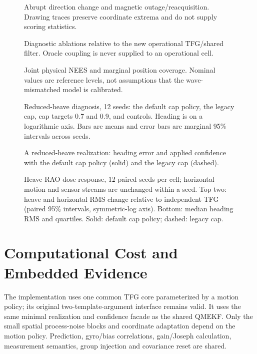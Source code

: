\documentclass[conference]{IEEEtran}
\newcommand{\fig}[1]{\resizebox{\linewidth}{!}{}}
\begin{document}
\begin{figure}[!t]\centering\fig{direction_outage}
\caption{Abrupt direction change and magnetic outage/reacquisition. Drawing
traces preserve coordinate extrema and do not supply scoring statistics.}
\end{figure}
\begin{figure}[!t]\centering\fig{ablations}
\caption{Diagnostic ablations relative to the new operational TFG/shared
filter. Oracle coupling is never supplied to an operational cell.}\end{figure}
\begin{figure}[!t]\centering\fig{consistency}
\caption{Joint physical NEES and marginal position coverage. Nominal values
are reference levels, not assumptions that the wave-mismatched model is calibrated.}\end{figure}
\begin{figure}[!t]\centering\fig{weak_diagnostics}
\caption{Reduced-heave diagnosis, 12 seeds: the default cap policy, the legacy
cap, cap targets 0.7 and 0.9, and controls. Heading is on a logarithmic axis.
Bars are means and error bars are marginal 95\% intervals across seeds.}
\end{figure}
\begin{figure}[!t]\centering\fig{weak_feedback}
\caption{A reduced-heave realization: heading error and applied confidence with
the default cap policy (solid) and the legacy cap (dashed).}
\end{figure}
\begin{figure}[!t]\centering\fig{heave_sweep}
\caption{Heave-RAO dose response, 12 paired seeds per cell; horizontal motion
and sensor streams are unchanged within a seed. Top two: heave and horizontal
RMS change relative to independent TFG (paired 95\% intervals, symmetric-log
axis). Bottom: median heading RMS and quartiles. Solid: default cap policy;
dashed: legacy cap.}\label{fig:heave-sweep}\end{figure}



\section{Computational Cost and Embedded Evidence}
The implementation uses one common TFG core parameterized by a motion policy;
its original two-template-argument interface remains valid. It uses the same
minimal realization and confidence facade as the shared QMEKF. Only the
small spatial process-noise blocks and coordinate adaptation depend on the
motion policy. Prediction, gyro/bias correlations, gain/Joseph calculation,
measurement semantics, group injection and covariance reset are shared.
\end{document}
